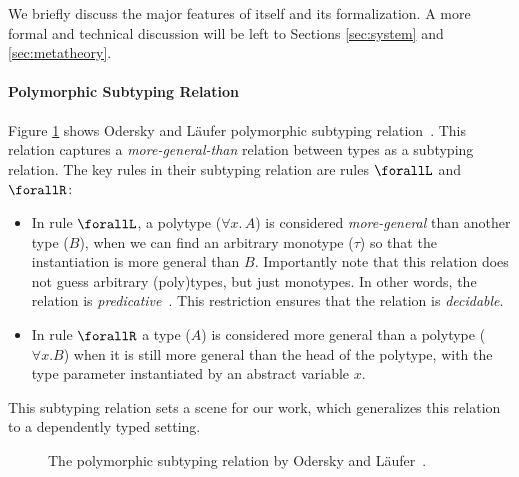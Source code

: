 We briefly discuss the major features of \name itself and
its formalization. A more formal and technical discussion will be left to
Sections \ref{sec:system} and \ref{sec:metatheory}.

\paragraph{Polymorphic Subtyping Relation}
Figure \ref{fig:polymorphic-subtyping} shows Odersky and L\"aufer polymorphic
subtyping relation~\cite{odersky1996putting}.
This relation captures a \emph{more-general-than} relation between
types as a subtyping relation. The key rules in their
subtyping relation are rules $\forallL$ and $\forallR$:

\begin{itemize}
  \item In rule $\forallL$, a polytype ($\forall x.\, A$) is considered \emph{more-general}
        than another type ($B$), when we can find an arbitrary monotype ($\tau$)
        so that the instantiation is more general than $B$.
        Importantly note that this relation does not guess arbitrary (poly)types,
        but just monotypes. In other words, the relation is \emph{predicative}~\cite{Martin-Lof-1972}.
        This restriction ensures that the relation is \emph{decidable}.

  \item In rule  $\forallR$ a type ($A$) is considered more general than a polytype ($\forall x. B$)
        when it is still more general than the head of the polytype, with the type
        parameter instantiated by an abstract variable $x$.
\end{itemize}

This subtyping relation sets a scene for our work, which
generalizes this relation to a dependently typed setting.

\begin{figure}
\centering


\caption{The polymorphic subtyping relation by Odersky and L\"aufer~\cite{odersky1996putting}.}
\label{fig:polymorphic-subtyping}
\end{figure}

